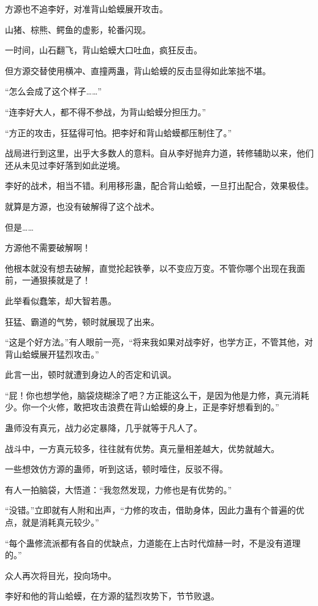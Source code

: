 \begin{this_body}
方源也不追李好，对准背山蛤蟆展开攻击。

山猪、棕熊、鳄鱼的虚影，轮番闪现。

一时间，山石翻飞，背山蛤蟆大口吐血，疯狂反击。

但方源交替使用横冲、直撞两蛊，背山蛤蟆的反击显得如此笨拙不堪。

“怎么会成了这个样子……”

“连李好大人，都不得不参战，为背山蛤蟆分担压力。”

“方正的攻击，狂猛得可怕。把李好和背山蛤蟆都压制住了。”

战局进行到这里，出乎大多数人的意料。自从李好抛弃力道，转修辅助以来，他们还从未见过李好落到如此逆境。

李好的战术，相当不错。利用移形蛊，配合背山蛤蟆，一旦打出配合，效果极佳。

就算是方源，也没有破解得了这个战术。

但是……

方源他不需要破解啊！

他根本就没有想去破解，直觉抡起铁拳，以不变应万变。不管你哪个出现在我面前，一通狠揍就是了！

此举看似蠢笨，却大智若愚。

狂猛、霸道的气势，顿时就展现了出来。

“这是个好方法。”有人眼前一亮，“将来我如果对战李好，也学方正，不管其他，对背山蛤蟆展开猛烈攻击。”

此言一出，顿时就遭到身边人的否定和讥讽。

“屁！你也想学他，脑袋烧糊涂了吧？方正能这么干，是因为他是力修，真元消耗少。你一个火修，敢把攻击浪费在背山蛤蟆的身上，正是李好想看到的。”

蛊师没有真元，战力必定暴降，几乎就等于凡人了。

战斗中，一方真元较多，往往就有优势。真元量相差越大，优势就越大。

一些想效仿方源的蛊师，听到这话，顿时噎住，反驳不得。

有人一拍脑袋，大悟道：“我忽然发现，力修也是有优势的。”

“没错。”立即就有人附和出声，“力修的攻击，借助身体，因此力蛊有个普遍的优点，就是消耗真元较少。”

“每个蛊修流派都有各自的优缺点，力道能在上古时代煊赫一时，不是没有道理的。”

众人再次将目光，投向场中。

李好和他的背山蛤蟆，在方源的猛烈攻势下，节节败退。


\end{this_body}
